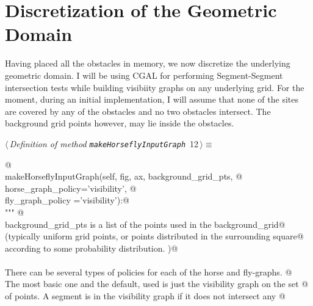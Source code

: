 \documentclass[11.5pt]{report}
\begin{document}

\section{Discretization of the Geometric Domain}

Having placed all the obstacles in memory, we now discretize the underlying geometric domain. I will be 
using CGAL for performing Segment-Segment intersection tests while building visibiity graphs on any 
underlying grid. For the moment, during an initial implementation, I will assume that none of the sites are 
covered by any of the obstacles and no two obstacles intersect. The background grid points however, 
may lie inside the obstacles. 

\begin{flushleft} \small
\begin{minipage}{\linewidth}\label{scrap11}\raggedright\small
{} $\langle\,${\itshape Definition of method \verb|makeHorseflyInputGraph|}\nobreak\ {\footnotesize {12}}$\,\rangle\equiv$
\vspace{-1ex}
\begin{list}{}{} \item
\mbox{}\verb@   @\\
\mbox{}\verb@def makeHorseflyInputGraph(self, fig, ax, background_grid_pts, @\\
\mbox{}\verb@                           horse_graph_policy='visibility', @\\
\mbox{}\verb@                           fly_graph_policy  ='visibility'):@\\
\mbox{}\verb@    """ @\\
\mbox{}\verb@      background_grid_pts is a list of the points used in the background_grid@\\
\mbox{}\verb@        (typically uniform grid points, or points distributed in the surrounding square@\\
\mbox{}\verb@        according to some probability distribution. )@\\
\mbox{}\verb@@\\
\mbox{}\verb@      There can be several types of policies for each of the horse and fly-graphs. @\\
\mbox{}\verb@      The most basic one and the default, used is just the visibility graph on the set @\\
\mbox{}\verb@      of points. A segment is in the visibility graph if it does not intersect any @\\

\end{list}
\end{minipage}
\end{flushleft}
\end{document}
